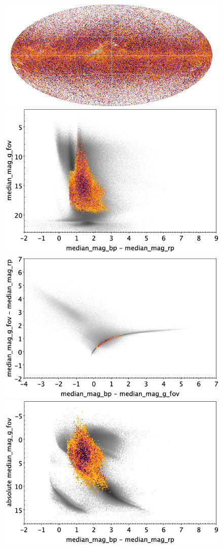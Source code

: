 \documentclass[longauth]{aa}
\begin{document}
\begin{appendix}
\begin{figure}
\centering
{}
\includegraphics[width=0.6\hsize]{figures/appendix/RS_cls_sky.png} 
 \\ %
\vspace{4mm}
 \includegraphics[width=0.45\hsize]{figures/appendix/RS_cls_cm.png}  %
\hspace{2mm}
 \includegraphics[width=0.45\hsize]{figures/appendix/RS_cls_cc.png} \\ %
\vspace{4mm}
 \includegraphics[width=0.45\hsize]{figures/appendix/RS_cls_cam.png}  %

\end{figure}
\end{appendix}
\end{document}
